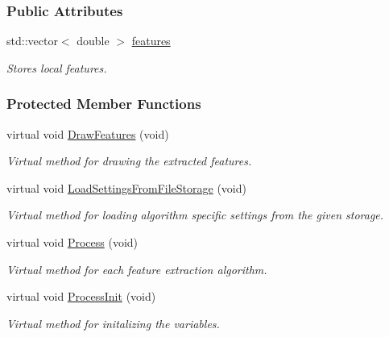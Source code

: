 \subsubsection*{Public Attributes}
\begin{DoxyCompactItemize}
\item 
std\-::vector$<$ double $>$ \hyperlink{group___feature_extractor_a8197cec0d029bac380885167df9f65e5}{features}
\begin{DoxyCompactList}\small\item\em Stores local features. \end{DoxyCompactList}\end{DoxyCompactItemize}
\subsubsection*{Protected Member Functions}
\begin{DoxyCompactItemize}
\item 
virtual void \hyperlink{group___feature_extractor_a329c560d8f02a4ab390716319410deab}{Draw\-Features} (void)
\begin{DoxyCompactList}\small\item\em Virtual method for drawing the extracted features. \end{DoxyCompactList}\item 
virtual void \hyperlink{group___feature_extractor_a9280742c803d38c984121a33cdd67723}{Load\-Settings\-From\-File\-Storage} (void)
\begin{DoxyCompactList}\small\item\em Virtual method for loading algorithm specific settings from the given storage. \end{DoxyCompactList}\item 
virtual void \hyperlink{group___feature_extractor_a2f5b230fd63be9c1dcceb51361bc6ee1}{Process} (void)
\begin{DoxyCompactList}\small\item\em Virtual method for each feature extraction algorithm. \end{DoxyCompactList}\item 
virtual void \hyperlink{group___feature_extractor_a2b2cdc0b1be48785e967a87c268ee27e}{Process\-Init} (void)
\begin{DoxyCompactList}\small\item\em Virtual method for initalizing the variables. \end{DoxyCompactList}\end{DoxyCompactItemize}
